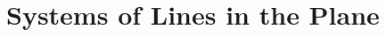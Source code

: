 \documentclass[00-livre-main.tex]{subfiles}
\begin{document}
\chapter{Systems of Lines in the Plane}
\end{document}
